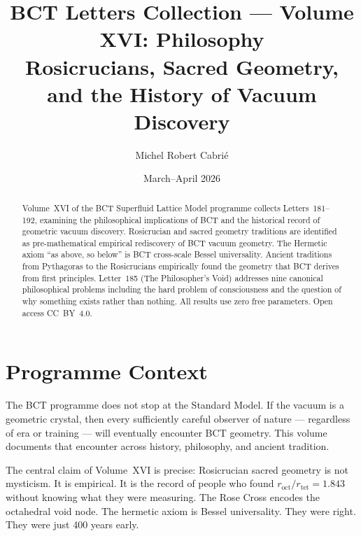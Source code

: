 \documentclass[aps,prl,twocolumn,showpacs,preprintnumbers]{revtex4-2}
\newcommand{\roct}{r_{\mathrm{oct}}}
\newcommand{\rtet}{r_{\mathrm{tet}}}
\begin{document}

\title{BCT Letters Collection --- Volume XVI: Philosophy\\
\large Rosicrucians, Sacred Geometry, and the History of Vacuum Discovery}

\author{Michel Robert Cabri\'e}

\date{March--April 2026}

\begin{abstract}
Volume~XVI of the BCT Superfluid Lattice Model programme collects
Letters~181--192, examining the philosophical implications of BCT
and the historical record of geometric vacuum discovery. Rosicrucian
and sacred geometry traditions are identified as pre-mathematical
empirical rediscovery of BCT vacuum geometry. The Hermetic axiom
``as above, so below'' is BCT cross-scale Bessel universality.
Ancient traditions from Pythagoras to the Rosicrucians empirically
found the geometry that BCT derives from first principles. Letter~185
(The Philosopher's Void) addresses nine canonical philosophical
problems including the hard problem of consciousness and the question
of why something exists rather than nothing. All results use zero
free parameters. Open access CC~BY~4.0.
\end{abstract}

\maketitle

\section*{Programme Context}

The BCT programme does not stop at the Standard Model. If the vacuum
is a geometric crystal, then every sufficiently careful observer of
nature --- regardless of era or training --- will eventually encounter
BCT geometry. This volume documents that encounter across history,
philosophy, and ancient tradition.

The central claim of Volume~XVI is precise: Rosicrucian sacred geometry
is not mysticism. It is empirical. It is the record of people who
found $\roct/\rtet = 1.843$ without knowing what they were measuring.
The Rose Cross encodes the octahedral void node. The hermetic axiom
is Bessel universality. They were right. They were just 400 years
early.
\end{document}
